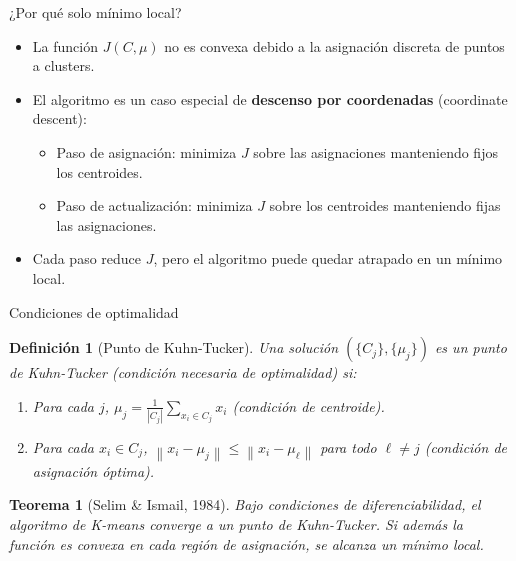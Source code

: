 \documentclass[aspectratio=169]{beamer}
\newtheorem{teorema}{Teorema}
\newtheorem{definicion}{Definición}
\newcommand{\norm}[1]{\left\lVert #1 \right\rVert}
\begin{document}
\begin{frame}{¿Por qué solo mínimo local?}
    \begin{itemize}
        \item La función \(J(C, \mu)\) no es convexa debido a la asignación discreta de puntos a clusters.
        \item El algoritmo es un caso especial de \textbf{descenso por coordenadas} (coordinate descent):
        \begin{itemize}
            \item Paso de asignación: minimiza \(J\) sobre las asignaciones manteniendo fijos los centroides.
            \item Paso de actualización: minimiza \(J\) sobre los centroides manteniendo fijas las asignaciones.
        \end{itemize}
        \item Cada paso reduce \(J\), pero el algoritmo puede quedar atrapado en un mínimo local.
    \end{itemize}
    
    \begin{center}
    \end{center}
\end{frame}

\begin{frame}{Condiciones de optimalidad}
    \begin{definicion}[Punto de Kuhn-Tucker]
        Una solución \((\{C_j\}, \{\mu_j\})\) es un punto de Kuhn-Tucker (condición necesaria de optimalidad) si:
        \begin{enumerate}
            \item Para cada \(j\), \(\mu_j = \frac{1}{|C_j|} \sum_{x_i \in C_j} x_i\) (condición de centroide).
            \item Para cada \(x_i \in C_j\), \(\norm{x_i - \mu_j} \leq \norm{x_i - \mu_\ell}\) para todo \(\ell \neq j\) (condición de asignación óptima).
        \end{enumerate}
    \end{definicion}
    
    \begin{teorema}[Selim \& Ismail, 1984]
        Bajo condiciones de diferenciabilidad, el algoritmo de K-means converge a un punto de Kuhn-Tucker. Si además la función es convexa en cada región de asignación, se alcanza un mínimo local.
    \end{teorema}
\end{frame}
\end{document}
